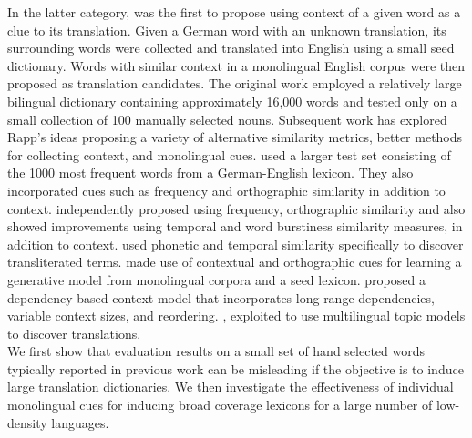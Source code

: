\documentclass{article}
\begin{document}
In the latter category, \cite{Rapp:1999} was the first to propose using context of a given word as a clue to its translation. Given a German word with an unknown translation, its surrounding words were collected and translated into English using a small seed dictionary.  Words with similar context in a monolingual English corpus were then proposed as translation candidates.  The original work employed a relatively large bilingual dictionary containing approximately 16,000 words and tested only on a small collection of 100 manually selected nouns.  Subsequent work has explored Rapp's ideas proposing a variety of alternative similarity metrics, better methods for collecting context, and monolingual cues.  \cite{Koehn:2002} used a larger test set consisting of the 1000 most frequent words from a German-English lexicon. They also incorporated cues such as frequency and orthographic similarity in addition to context. \cite{Schafer:2002} independently proposed using frequency, orthographic similarity and also showed improvements using temporal and word burstiness similarity measures, in addition to context.  \cite{Klementiev:2006b} used phonetic and temporal similarity specifically to discover transliterated terms.  \cite{Haghighi:2008} made use of contextual and orthographic cues for learning a generative model from monolingual corpora and a seed lexicon.  \cite{Garera:2009} proposed a dependency-based context model that incorporates long-range dependencies, variable context sizes, and reordering.  \cite{Mimno:2009}, \cite{Boyd-Graber:2009} exploited to use multilingual topic models to discover translations.\\

We first show that evaluation results on a small set of hand selected words typically reported in previous work can be misleading if the objective is to induce large translation dictionaries.  We then investigate the effectiveness of individual monolingual cues for inducing broad coverage lexicons for a large number of low-density languages. \\

\end{document}
